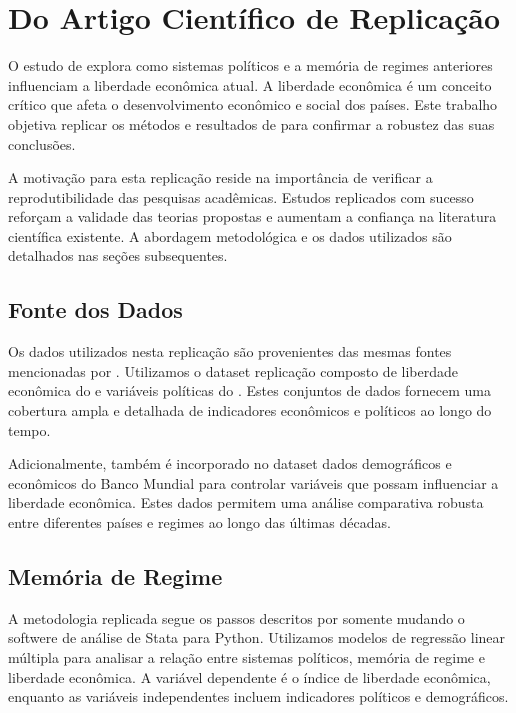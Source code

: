 


\section{Do Artigo Científico de Replicação}

O estudo de \cite{https://doi.org/10.1111/coep.12635} explora como sistemas políticos e a memória de regimes anteriores influenciam a liberdade econômica atual. A liberdade econômica é um conceito crítico que afeta o desenvolvimento econômico e social dos países. Este trabalho objetiva replicar os métodos e resultados de \cite{https://doi.org/10.1111/coep.12635} para confirmar a robustez das suas conclusões.

A motivação para esta replicação reside na importância de verificar a reprodutibilidade das pesquisas acadêmicas. Estudos replicados com sucesso reforçam a validade das teorias propostas e aumentam a confiança na literatura científica existente. A abordagem metodológica e os dados utilizados são detalhados nas seções subsequentes.


\subsection{Fonte dos Dados}
Os dados utilizados nesta replicação são provenientes das mesmas fontes mencionadas por \cite{https://doi.org/10.1111/coep.12635}. Utilizamos o dataset replicação composto de liberdade econômica do \cite{fraser2022} e variáveis políticas do \cite{polity2022}. Estes conjuntos de dados fornecem uma cobertura ampla e detalhada de indicadores econômicos e políticos ao longo do tempo.

Adicionalmente, também é incorporado no dataset dados demográficos e econômicos do Banco Mundial para controlar variáveis que possam influenciar a liberdade econômica. Estes dados permitem uma análise comparativa robusta entre diferentes países e regimes ao longo das últimas décadas.

\subsection{Memória de Regime}
A metodologia replicada segue os passos descritos por \cite{https://doi.org/10.1111/coep.12635} somente mudando o softwere de análise de Stata para Python. Utilizamos modelos de regressão linear múltipla para analisar a relação entre sistemas políticos, memória de regime e liberdade econômica. A variável dependente é o índice de liberdade econômica, enquanto as variáveis independentes incluem indicadores políticos e demográficos.

